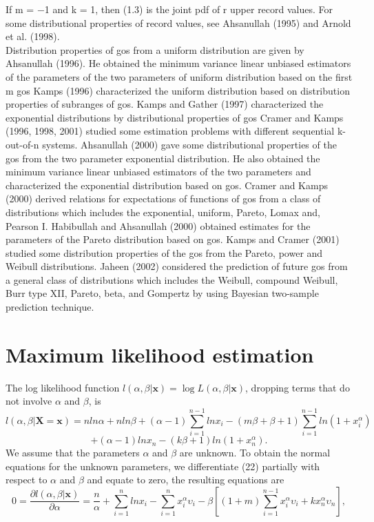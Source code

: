 \documentclass[a4paper, 11pt]{article}
\numberwithin{equation}{section}
\begin{document}
 If m = −1 and k = 1, then (1.3) is the joint pdf of r upper record values. For some distributional properties of record values, see Ahsanullah (1995) and Arnold et al. (1998).\\
 Distribution properties of gos from a uniform distribution are given by Ahsanullah (1996). He obtained the minimum variance linear unbiased estimators of the parameters of the two parameters of uniform distribution based on the ﬁrst m gos Kamps (1996) characterized the uniform distribution based on distribution properties of subranges of gos. Kamps and Gather (1997) characterized the exponential distributions by distributional properties of gos Cramer and Kamps (1996, 1998, 2001) studied some estimation problems with different sequential k-out-of-n systems. Ahsanullah (2000) gave some distributional properties of the gos from the two parameter exponential distribution. He also obtained the minimum variance linear unbiased estimators of the two parameters and characterized the exponential distribution based on gos. Cramer and Kamps (2000) derived relations for expectations of functions of gos from a class of distributions which includes the exponential, uniform, Pareto, Lomax and, Pearson I. Habibullah and Ahsanullah (2000) obtained estimates for the parameters of the Pareto distribution based on gos. Kamps and Cramer (2001) studied some distribution properties of the gos from the Pareto, power and Weibull distributions. Jaheen (2002) considered the prediction of future gos from a general class of distributions which includes the Weibull, compound Weibull, Burr type XII, Pareto, beta, and Gompertz by using Bayesian  two-sample  prediction technique.
\section{Maximum likelihood estimation}
The log likelihood function $l(\alpha, \beta|\mathbf{x})=\log L(\alpha, \beta|\mathbf{x})$, dropping terms that do not involve $\alpha$ and $\beta$, is 
\begin{equation*}
l(\alpha, \beta|\mathbf{X=x})=nln\alpha+nln\beta+(\alpha-1)\sum_{i=1}^{n-1}ln x_{i}-(m\beta+\beta+1)\sum_{i=1}^{n-1}ln(1+x_{i}^{\alpha})
\end{equation*}
\begin{equation}
+(\alpha-1)lnx_{n}-(k\beta+1)ln(1+x_{n}^{\alpha}).
\end{equation}
We assume that the parameters $\alpha$ and $\beta$ are unknown. To obtain the normal equations for the unknown parameters, we differentiate (22) partially with respect to $\alpha$ and $\beta$ and equate to zero, the resulting equations are 
\begin{equation}
0=\frac{\partial l(\alpha, \beta|\mathbf{x})}{\partial \alpha}=\frac{n}{\alpha}+\sum_{i=1}^{n}ln x_{i}-\sum_{i=1}^{n}x_{i}^{\alpha}\upsilon_{i}-\beta\left[(1+m)\sum_{i=1}^{n-1}x_{i}^{\alpha}\upsilon_{i}+k x_{n}^{\alpha}\upsilon_{n}\right],
\label{alfa_mle}
\end{equation}
\end{document}

